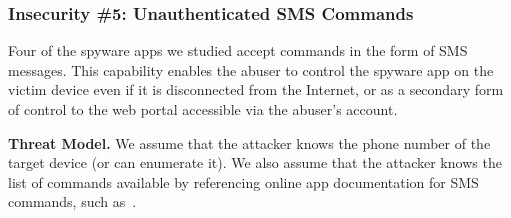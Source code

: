 



\subsubsection*{Insecurity \#5: Unauthenticated SMS Commands}

Four of the spyware apps we studied accept commands in
the form of SMS messages.  This capability enables the abuser to
control the spyware app on the victim device even if it is
disconnected from the Internet, or as a secondary form of control to
the web portal accessible via the abuser's account.

\textbf{Threat Model.} We assume that the attacker knows the phone
number of the target device (or can enumerate it). We also assume that
the attacker knows the list of commands available by referencing online
app documentation for SMS commands, such as~\cite{SpappSMSCommands:online,
  FlexispySMSCommands:online}.

